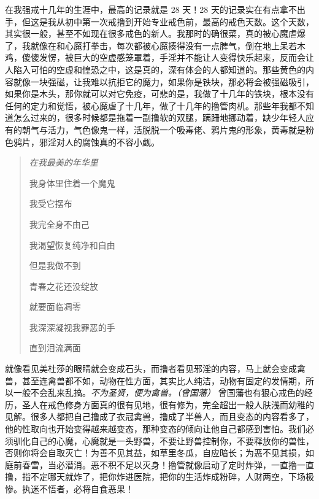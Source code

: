 在我强戒十几年的生涯中，最高的记录就是 28 天！28 天的记录实在有点拿不出手，但这是我从初中第一次戒撸到开始专业戒色前，最高的戒色天数。这个天数，其实很一般，甚至不如现在很多戒色的新人。我那时的确很菜，真的被心魔虐爆了，我就像在和心魔打拳击，每次都被心魔揍得没有一点脾气，倒在地上呆若木鸡，傻傻发愣，被巨大的空虚感笼罩着，手淫并不能让人变得快乐起来，反而会让人陷入可怕的空虚和惶恐之中，这是真的，深有体会的人都知道的。那些黄色的内容就像一块强磁，让我难以抗拒它的魔力，如果你是铁块，那必将会被强磁吸引，如果你是木头，那你就可以对它免疫，可悲的是，我做了十几年的铁块，根本没有任何的定力和觉悟，被心魔虐了十几年，做了十几年的撸管肉机。那些年我都不知道怎么过来的，很多时候都是拖着一副撸软的双腿，蹒跚地挪动着，缺少年轻人应有的朝气与活力，气色像鬼一样，活脱脱一个吸毒佬、鸦片鬼的形象，黄毒就是粉色鸦片，邪淫对人的腐蚀真的不容小觑。

\begin{multicols}{2}
    \begin{quotation}\it
        在我最美的年华里

        我身体里住着一个魔鬼

        我受它摆布

        我完全身不由己

        我渴望恢复纯净和自由

        但是我做不到

        青春之花还没绽放

        就要面临凋零

        我深深凝视我罪恶的手

        直到泪流满面
    \end{quotation}
\end{multicols}

就像看见美杜莎的眼睛就会变成石头，而撸者看见邪淫的内容，马上就会变成禽兽，甚至连禽兽都不如，动物在性方面，其实比人纯洁，动物有固定的发情期，所以一般不会乱来乱搞。\textit{不为圣贤，便为禽兽。（曾国藩）} 曾国藩也有狠心戒色的经历，圣人在戒色修身方面真的很有见地，很有修为，完全超出一般人肤浅而幼稚的见解。很多人都把自己撸成了衣冠禽兽，撸成了半兽人，而且变态的内容看多了，他的性取向也开始变得越来越变态，那种变态的倾向让他自己都感到害怕。我们必须驯化自己的心魔，心魔就是一头野兽，不要让野兽控制你，不要释放你的兽性，否则你将会自取灭亡！为善不见其益，如草里冬瓜，自应暗长；为恶不见其损，如庭前春雪，当必潜消。恶不积不足以灭身！撸管就像启动了定时炸弹，一直撸一直撸，指不定哪天就炸了，把你炸进医院，把你的生活炸成粉碎，人财两空，下场极惨。执迷不悟者，必将自食恶果！

